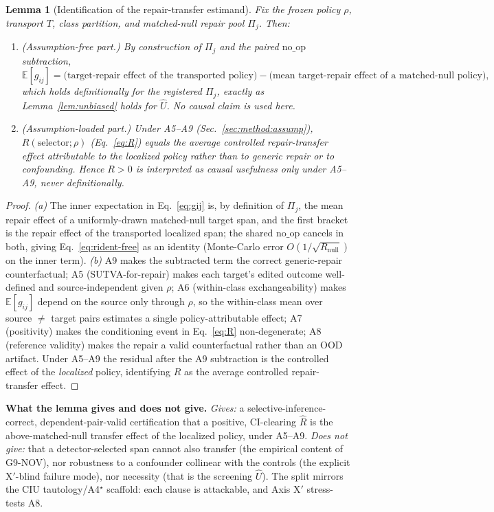 \documentclass[11pt]{article}
\theoremstyle{plain}
\newtheorem{lemma}{Lemma}
\theoremstyle{definition}
\newcommand{\Uhat}{\widehat{U}}
\newcommand{\Rhat}{\widehat{R}}
\newcommand{\Pij}{\Pi_j}
\newcommand{\Eop}{\mathbb{E}}
\newcommand{\noop}{\mathrm{no\_op}}
\newcommand{\policy}{\rho}
\begin{document}
\begin{lemma}[Identification of the repair-transfer estimand]\label{lem:rident}
Fix the frozen policy $\policy$, transport $T$, class partition, and matched-null
repair pool $\Pij$. Then:
\begin{enumerate}[leftmargin=1.6em,itemsep=2pt,label=(\alph*)]
  \item \emph{(Assumption-free part.)} By construction of $\Pij$ and the paired
  $\noop$ subtraction,
  \begin{equation}
  \Eop[g_{ij}] = \big(\text{target-repair effect of the transported policy}\big)
              - \big(\text{mean target-repair effect of a matched-null policy}\big),
  \label{eq:rident-free}
  \end{equation}
  which holds \emph{definitionally} for the registered $\Pij$, exactly as
  Lemma~\ref{lem:unbiased} holds for $\Uhat$. No causal claim is used here.
  \item \emph{(Assumption-loaded part.)} Under A5--A9
  (Sec.~\ref{sec:method:assump}), $R(\text{selector};\policy)$ (Eq.~\ref{eq:R})
  equals the average controlled repair-transfer effect attributable to the
  \emph{localized} policy rather than to generic repair or to confounding. Hence
  $R>0$ is interpreted as causal usefulness \emph{only} under A5--A9, never
  definitionally.
\end{enumerate}
\end{lemma}
\begin{proof}
\emph{(a)} The inner expectation in Eq.~\ref{eq:gij} is, by definition of $\Pij$,
the mean repair effect of a uniformly-drawn matched-null target span, and the first
bracket is the repair effect of the transported localized span; the shared $\noop$
cancels in both, giving Eq.~\ref{eq:rident-free} as an identity (Monte-Carlo error
$O(1/\sqrt{R_{\mathrm{null}}})$ on the inner term).
\emph{(b)} A9 makes the subtracted term the correct generic-repair counterfactual;
A5 (SUTVA-for-repair) makes each target's edited outcome well-defined and
source-independent given $\policy$; A6 (within-class exchangeability) makes
$\Eop[g_{ij}]$ depend on the source only through $\policy$, so the within-class mean
over source $\ne$ target pairs estimates a single policy-attributable effect; A7
(positivity) makes the conditioning event in Eq.~\ref{eq:R} non-degenerate; A8
(reference validity) makes the repair a valid counterfactual rather than an
OOD artifact. Under A5--A9 the residual after the A9 subtraction is the controlled
effect of the \emph{localized} policy, identifying $R$ as the average controlled
repair-transfer effect.
\end{proof}
\noindent\textbf{What the lemma gives and does not give.} \emph{Gives:} a
selective-inference-correct, dependent-pair-valid certification that a positive,
CI-clearing $\Rhat$ is the above-matched-null transfer effect of the localized
policy, under A5--A9. \emph{Does not give:} that a detector-selected span cannot
also transfer (the empirical content of G9-NOV), nor robustness to a confounder
collinear with the controls (the explicit X$'$-blind failure mode), nor necessity
(that is the screening $\Uhat$). The split mirrors the CIU tautology/A4$^\star$
scaffold: each clause is attackable, and Axis X$'$ stress-tests A8.
\end{document}

